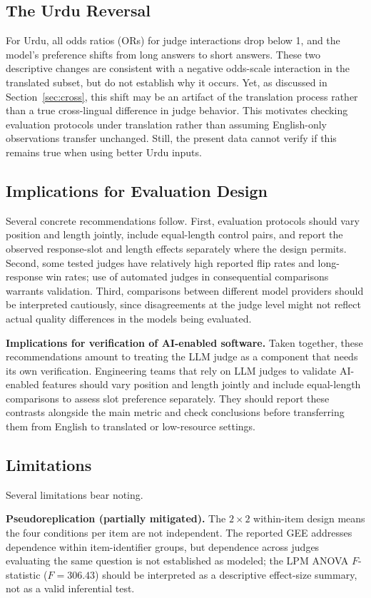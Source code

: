 \documentclass[10pt,conference]{IEEEtran}
\begin{document}
\subsection{The Urdu Reversal}
For Urdu, all odds ratios (ORs) for judge interactions drop below 1, and the model's preference shifts from long answers to short answers. These two descriptive changes are consistent with a negative odds-scale interaction in the translated subset, but do not establish why it occurs. Yet, as discussed in Section~\ref{sec:cross}, this shift may be an artifact of the translation process rather than a true cross-lingual difference in judge behavior. This motivates checking evaluation protocols under translation rather than assuming English-only observations transfer unchanged. Still, the present data cannot verify if this remains true when using better Urdu inputs.

\subsection{Implications for Evaluation Design}
Several concrete recommendations follow. First, evaluation protocols should vary position and length jointly, include equal-length control pairs, and report the observed response-slot and length effects separately where the design permits. Second, some tested judges have relatively high reported flip rates and long-response win rates; use of automated judges in consequential comparisons warrants validation. Third, comparisons between different model providers should be interpreted cautiously, since disagreements at the judge level might not reflect actual quality differences in the models being evaluated.

\textbf{Implications for verification of AI-enabled software.} Taken together, these recommendations amount to treating the LLM judge as a component that needs its own verification. Engineering teams that rely on LLM judges to validate AI-enabled features should vary position and length jointly and include equal-length comparisons to assess slot preference separately. They should report these contrasts alongside the main metric and check conclusions before transferring them from English to translated or low-resource settings.

\subsection{Limitations}
Several limitations bear noting.

\textbf{Pseudoreplication (partially mitigated).} The $2\times2$ within-item design means the four conditions per item are not independent. The reported GEE addresses dependence within item-identifier groups, but dependence across judges evaluating the same question is not established as modeled; the LPM ANOVA $F$-statistic ($F=306.43$) should be interpreted as a descriptive effect-size summary, not as a valid inferential test.
\end{document}
